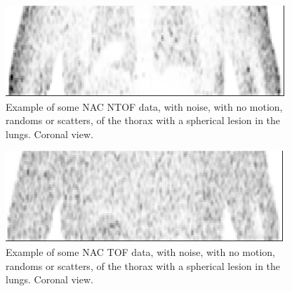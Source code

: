                 \begin{figure}
                    \centering
                    
                    \includegraphics[width=1.0\linewidth]{figures/background_non_tof_example.png}
                    
                    \captionsetup{singlelinecheck=false, justification=raggedright}
                    \caption{Example of some \gls{NAC} \gls{NTOF} data, with noise, with no motion, randoms or scatters, of the thorax with a spherical lesion in the lungs. Coronal view.} \label{fig:time_of_flight_pet_non_tof_example}
                \end{figure}
                
                \begin{figure}
                    \centering
                    
                    \includegraphics[width=1.0\linewidth]{figures/background_tof_example.png}
                    
                    \captionsetup{singlelinecheck=false, justification=raggedright}
                    \caption{Example of some \gls{NAC} \gls{TOF} data, with noise, with no motion, randoms or scatters, of the thorax with a spherical lesion in the lungs. Coronal view.} \label{fig:time_of_flight_pet_tof_example}
                \end{figure}
                
